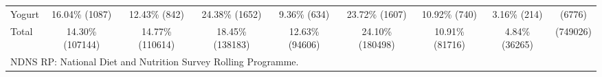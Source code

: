 \documentclass[utf8]{frontiers_suppmat} %
\newcommand{\elandscape}{\end{landscape}}
\begin{document}
\begin{table}[]
{\begin{tabular}{@{}lcccccccc@{}}
Yogurt                    & 16.04\%   (1087) & 12.43\%    (842) & 24.38\%   (1652) & 9.36\%   (634)  & 23.72\%   (1607) & 10.92\%   (740) & 3.16\%   (214)  &    (6776) \\
Total                     & 14.30\% (107144) & 14.77\% (110614) & 18.45\% (138183) & 12.63\% (94606) & 24.10\% (180498) & 10.91\% (81716) & 4.84\% (36265)  &  (749026) \\ \bottomrule
		\multicolumn{9}{l}{NDNS RP: National Diet and Nutrition Survey Rolling Programme. }
\end{tabular}
}
\end{table}



\newpage




\begin{table}[]
\center


\end{table}
\end{document}
